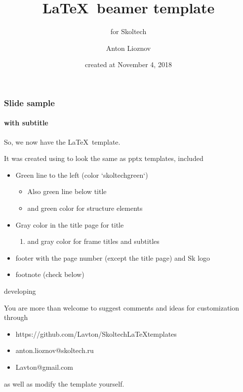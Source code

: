 \documentclass{beamer}
\begin{document}
\title{\LaTeX ~beamer template}
\subtitle{for Skoltech}
\author{Anton Lioznov}
\date{created at November 4, 2018}
\frame{\titlepage}

\begin{frame}\frametitle{Slide sample}\framesubtitle{with subtitle}
So, we now have the \LaTeX ~template.

It was created using to look the same as pptx templates,
included
\begin{itemize}
    \item Green line to the left (color `skoltechgreen`)
    \begin{itemize}
        \item Also green line below title
        \item and green color for structure elements
    \end{itemize}
    \item Gray color in the title page for title
    \begin{enumerate}
        \item and gray color for frame titles and subtitles 
    \end{enumerate}
    \item footer with the page number (except the title page) and Sk logo
    \item footnote (check below)
\end{itemize}

\end{frame}

\begin{frame}{developing}

You are more than welcome to suggest comments and ideas for customization through
\begin{itemize}
    \item https://github.com/Lavton/SkoltechLaTeXtemplates
    \item anton.lioznov@skoltech.ru
    \item Lavton@gmail.com
\end{itemize}
as well as modify the template yourself.

\end{frame}
\end{document}
